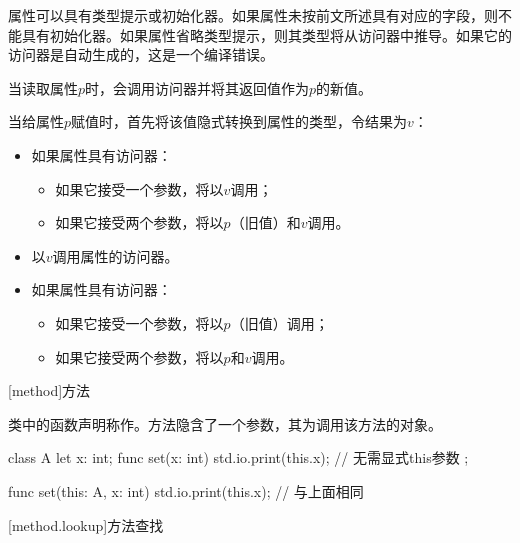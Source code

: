 \pnum
属性可以具有类型提示或初始化器。如果属性未按前文所述具有对应的字段，则不能具有初始化器。如果属性省略类型提示，则其类型将从访问器中推导。如果它的访问器是自动生成的，这是一个编译错误。

\pnum
当读取属性$p$时，会调用访问器并将其返回值作为$p$的新值。

\pnum
当给属性$p$赋值时，首先将该值隐式转换到属性的类型，令结果为$v$：

\begin{itemize}
    \item 如果属性具有访问器：
    \begin{itemize}
        \item 如果它接受一个参数，将以$v$调用；
        \item 如果它接受两个参数，将以$p$（旧值）和$v$调用。
    \end{itemize}
    \item 以$v$调用属性的访问器。
    \item 如果属性具有访问器：
    \begin{itemize}
        \item 如果它接受一个参数，将以$p$（旧值）调用；
        \item 如果它接受两个参数，将以$p$和$v$调用。
    \end{itemize}
\end{itemize}

[method]{方法}

\pnum
类中的函数声明称作。方法隐含了一个参数，其为调用该方法的对象。

\enterexample
\begin{codeblock}
class A {
    let x: int;
    func set(x: int) {
        std.io.print(this.x); // 无需显式this参数
    }
};

func set(this: A, x: int) {
    std.io.print(this.x); // 与上面相同
}

\end{codeblock}
\exitexample

[method.lookup]{方法查找}

\pnum
